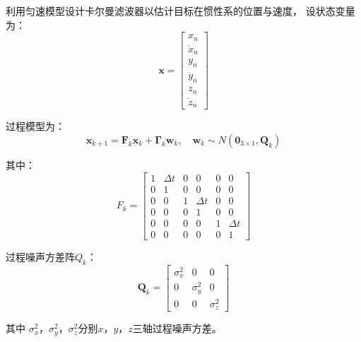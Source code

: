 利用匀速模型设计卡尔曼滤波器以估计目标在惯性系的位置与速度，
设状态变量为：\begin{equation} \boldsymbol x =\left[\begin{array}{c} x_n\\ \dot x_n\\ y_n\\ \dot y_n\\ z_n\\ \dot z_n \end{array}\right] \end{equation}
\par
过程模型为：\begin{equation} \boldsymbol  x_{k+1} = \boldsymbol F_k\boldsymbol  x_k + \boldsymbol{\Gamma}_{k}\boldsymbol {w}_{k}, \quad \boldsymbol {w}_{k} \sim N\left(\boldsymbol 0_{3 \times 1}, \boldsymbol Q_k \right) \end{equation}

其中： 
\begin{equation} F_k =\left[\begin{array}{cccccc} 1 &  \Delta t & 0 &0&0&0\\ 0 &  1 & 0 &0&0&0\\ 0 & 0 & 1&  \Delta t & 0 &0\\ 0&0&   0&1 &0 &0\\ 0 &0& 0 &0& 1 &\Delta t \\ 0 &0& 0 & 0 &0 &1 \end{array}\right] \end{equation}

过程噪声方差阵$Q_k$：
\begin{equation} \boldsymbol Q_k =\left[\begin{array}{ccc} \sigma_x^2 &  0 & 0 \\ 0 &  \sigma_y^2 & 0 \\ 0 & 0 & \sigma_z^2 \end{array}\right] \end{equation}
\par
其中 $\sigma_x^2$，$\sigma_y ^2$，$\sigma_z^2$分别$x$，$y$，$z$三轴过程噪声方差。
\par


